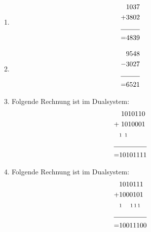 \documentclass[DIN, pagenumber=false, fontsize=11pt, parskip=half]{scrartcl}
\begin{document}
    \subsection{}
    \begin{enumerate}[label = (\alph*)]
        \item 
            \begin{align*}
                & 1037 \\
                + & \hspace{0.0cm} 3802  \\
                \cline{1-2}  
                = &4839  
            \end{align*}
        \item 
            \begin{align*}
                & 9548\\
                - & \hspace{0.0cm} 3027  \\
                \cline{1-2}  
                = &6521  
            \end{align*}
        \item Folgende Rechnung ist im Dualsystem:
            \begin{align*}
                & \hspace{0.1cm} 1010110\\
                + & \hspace{0.1cm}1010001 \\
                & \hspace{0.0cm} {\scriptstyle 1\, \, \, 1} \\
                \cline{1-2}  
                = &10101111
            \end{align*}
        \item Folgende Rechnung ist im Dualsystem:
            \begin{align*}
                & \hspace{0.0cm} 1010111\\
                + & \hspace{0.0cm}1000101 \\
                & \hspace{0.0cm} {\scriptstyle 1\, \, \, \, \ \ 1\, 1\, 1} \\
                \cline{1-2}  
                = &10011100
            \end{align*}
    \end{enumerate}
\end{document}
